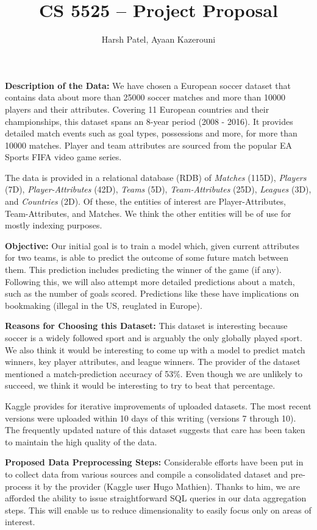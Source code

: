 \documentclass[11pt, letterpaper]{article}
\begin{document}
\title{CS 5525 -- Project Proposal}
\author{Harsh Patel, Ayaan Kazerouni}
\date{}
\maketitle
\textbf{Description of the Data:} We have chosen a European soccer dataset that contains data about more than 25000 soccer matches and more than 10000 players and their attributes.
Covering 11 European countries and their championships, this dataset spans an 8-year period (2008 - 2016).
It provides detailed match events such as goal types, possessions and more, for more than 10000 matches.
Player and team attributes are sourced from the popular EA Sports FIFA video game series.

The data is provided in a relational database (RDB) of \textit{Matches} (115D), \textit{Players} (7D), \textit{Player-Attributes} (42D), \textit{Teams} (5D), \textit{Team-Attributes} (25D), \textit{Leagues} (3D), and \textit{Countries} (2D).
Of these, the entities of interest are Player-Attributes, Team-Attributes, and Matches.
We think the other entities will be of use for mostly indexing purposes.

\textbf{Objective:} Our initial goal is to train a model which, given current attributes for two teams, is able to predict the outcome of some future match between them.
This prediction includes predicting the winner of the game (if any).
Following this, we will also attempt more detailed predictions about a match, such as the number of goals scored.
Predictions like these have implications on bookmaking (illegal in the US, reuglated in Europe).

\textbf{Reasons for Choosing this Dataset:} This dataset is interesting because soccer is a widely followed sport and is arguably the only globally played sport.
We also think it would be interesting to come up with a model to predict match winners, key player attributes, and league winners.
The provider of the dataset mentioned a match-prediction accuracy of 53\%.
Even though we are unlikely to succeed, we think it would be interesting to try to beat that percentage.

Kaggle provides for iterative improvements of uploaded datasets.
The most recent versions were uploaded within 10 days of this writing (versions 7 through 10).
The frequently updated nature of this dataset suggests that care has been taken to maintain the high quality of the data.

\textbf{Proposed Data Preprocessing Steps:} Considerable efforts have been put in to collect data from various sources and compile a consolidated dataset and pre-process it by the provider (Kaggle user Hugo Mathien).
Thanks to him, we are afforded the ability to issue straightforward SQL queries in our data aggregation steps.
This will enable us to reduce dimensionality to easily focus only on areas of interest.
\end{document}
